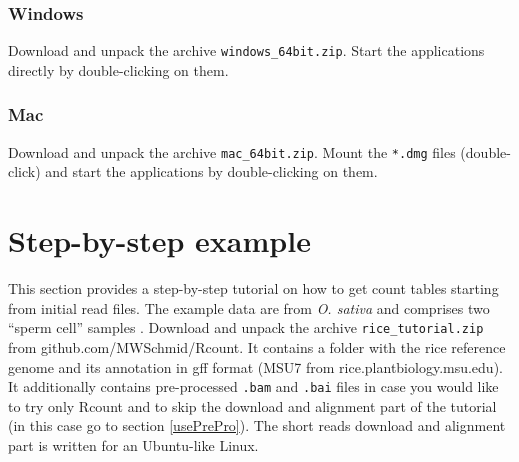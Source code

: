 \documentclass[a4paper,10pt]{article}
\newcommand{\myWeb}{github.com/MWSchmid/Rcount}
\begin{document}
\subsubsection{Windows}
Download and unpack the archive \texttt{windows\_64bit.zip}. Start the applications directly by double-clicking on them.
\subsubsection{Mac}
Download and unpack the archive \texttt{mac\_64bit.zip}. Mount the \texttt{*.dmg} files (double-click) and start the applications by double-clicking on them.
\clearpage
\section{Step-by-step example}
This section provides a step-by-step tutorial on how to get count tables starting from initial read files. The example data are from \textit{O. sativa} and comprises two ``sperm cell'' samples \cite{2013_Anderson}. Download and unpack the archive \texttt{rice\_tutorial.zip} from {\myWeb}. It contains a folder with the rice reference genome and its annotation in gff format (MSU7 from rice.plantbiology.msu.edu). It additionally contains pre-processed \texttt{.bam} and \texttt{.bai} files in case you would like to try only Rcount and to skip the download and alignment part of the tutorial (in this case go to section \ref{usePrePro}). The short reads download and alignment part is written for an Ubuntu-like Linux.
\end{document}
